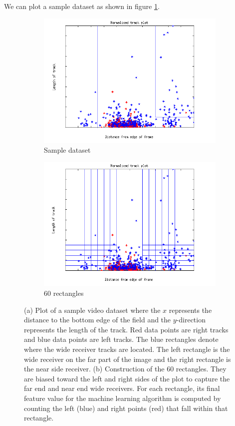\documentclass{article} %
\begin{document}
We can plot a sample dataset as shown in figure \ref{fig:plot_sample}.

\begin{figure}
\centering
 \begin{subfigure}{.5\textwidth}
  \centering
  \includegraphics[width=1\linewidth]{img/aaa.png}
  \caption{Sample dataset}
  \label{fig:plot_sample}
 \end{subfigure}%
 \begin{subfigure}{.5\textwidth}
  \centering
  \includegraphics[width=1\linewidth]{img/aaa1.png}
  \caption{60 rectangles}
  \label{fig:plot_rectangles}
 \end{subfigure}
\caption{(a) Plot of a sample video dataset where the $x$ represents the distance to the bottom edge of the field and the $y$-direction represents the length of the track. Red data points are right tracks and blue data points are left tracks. The blue rectangles denote where the wide receiver tracks are located. The left rectangle is the wide receiver on the far part of the image and the right rectangle is the near side receiver. (b) Construction of the 60 rectangles. They are biased toward the left and right sides of the plot to capture the far end and near end wide receivers. For each rectangle, its final feature value for the machine learning algorithm is computed by counting the left (blue) and right points (red) that fall within that rectangle.}
\label{fig:plot}
\end{figure}
\end{document}
